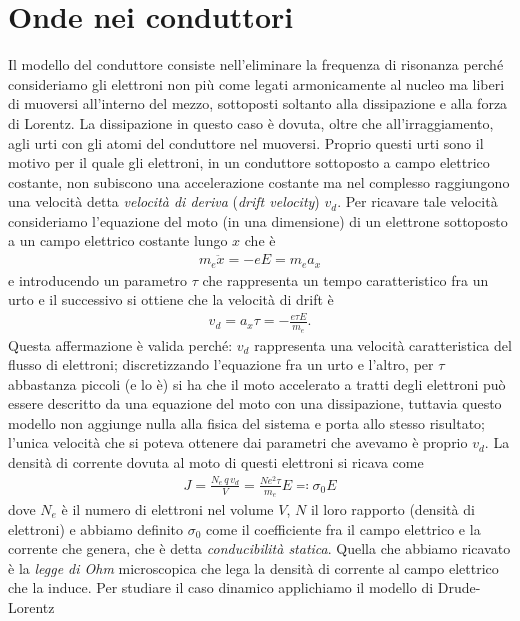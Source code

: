 \section{Onde nei conduttori}
Il modello del conduttore consiste nell'eliminare la frequenza di risonanza perché consideriamo gli elettroni non più come legati armonicamente al nucleo 
ma liberi di muoversi all'interno del mezzo, sottoposti soltanto alla dissipazione e alla forza di Lorentz. La dissipazione in questo caso è dovuta, 
oltre che all'irraggiamento, agli urti con gli atomi del conduttore nel muoversi. Proprio questi urti sono il motivo per il quale gli elettroni, in un 
conduttore sottoposto a campo elettrico costante, non subiscono una accelerazione costante ma nel complesso raggiungono una velocità detta 
\textit{velocità di deriva} (\textit{drift velocity}) $ v_d $. Per ricavare tale velocità consideriamo l'equazione del moto (in una dimensione) di un 
elettrone sottoposto a un campo elettrico costante lungo $ x $ che è
\begin{align}
  m_e \ddot{x} = - e E = m_e a_x
\end{align}
e introducendo un parametro $ \tau $ che rappresenta un tempo caratteristico fra un urto e il successivo si ottiene che la velocità di drift è
\begin{align}
  v_d = a_x \tau = - \frac{e \tau E}{m_e}.
\end{align}
Questa affermazione è valida perché: $ v_d $ rappresenta una velocità caratteristica del flusso di elettroni; discretizzando l'equazione fra un urto e 
l'altro, per $ \tau $ abbastanza piccoli (e lo è) si ha che il moto accelerato a tratti degli elettroni può essere descritto da una equazione del moto con 
una dissipazione, tuttavia questo modello non aggiunge nulla alla fisica del sistema e porta allo stesso risultato; l'unica velocità che si poteva ottenere 
dai parametri che avevamo è proprio $ v_d $. La densità di corrente dovuta al moto di  questi elettroni si ricava come
\begin{align}
  J = \frac{N_e \,q\, v_d}{V} = \frac{N e^2 \tau }{m_e} E \eqcolon \sigma_0 E
\end{align}
dove $ N_e $ è il numero di elettroni nel volume $ V $, $ N $ il loro rapporto (densità di elettroni) e abbiamo definito $ \sigma_0 $ come il coefficiente 
fra il campo elettrico e la corrente che genera, che è detta \textit{conducibilità statica}. Quella che abbiamo ricavato è la \textit{legge di Ohm} 
microscopica che lega la densità di corrente al campo elettrico che la induce. Per studiare il caso dinamico applichiamo il modello di Drude-Lorentz 
